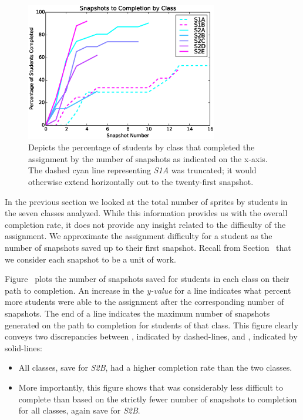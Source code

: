 \begin{figure}[!t]
\centering \includegraphics[width=3.3in]{graphs/snapshots_to_completion.eps}
\caption{Depicts the percentage of students by class that completed the
  assignment by the number of snapshots as indicated on the x-axis. The dashed
  cyan line representing \emph{S1A} was truncated; it would otherwise extend
  horizontally out to the twenty-first snapshot.}
\end{figure}

In the previous section we looked at the total number of sprites \caught{} by
students in the seven classes analyzed. While this information provides us with
the overall completion rate, it does not provide any insight related to the
difficulty of the assignment. We approximate the assignment difficulty for a
student as the number of snapshots saved up to their first \com{}
snapshot. Recall from Section~ that we consider each
snapshot to be a unit of work.

Figure~ plots the number of snapshots
saved for students in each class on their path to completion. An increase in
the \emph{y-value} for a line indicates what percent more students were able to
\com{} the assignment after the corresponding number of snapshots. The end of a
line indicates the maximum number of snapshots generated on the path to
completion for students of that class. This figure clearly conveys two
discrepancies between \sone{}, indicated by dashed-lines, and \stwo{},
indicated by solid-lines:

\begin{itemize}
\item All \stwo{} classes, save for \emph{S2B}, had a higher completion rate
  than the two \sone{} classes.
\item More importantly, this figure shows that \stwo{} was considerably less
  difficult to complete than \sone{} based on the strictly fewer number of
  snapshots to completion for all \stwo{} classes, again save for \emph{S2B}.
\end{itemize}

